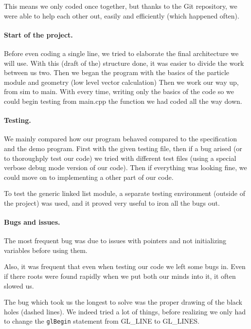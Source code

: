 \documentclass[a4paper]{article} %
\begin{document}
\begin{multicols*}{2}
This means we only coded once together, but thanks to the Git repository,
we were able to help each other out, easily and efficiently (which happened often).

\paragraph{Start of the project.} Before even coding a single line, we tried to elaborate the final
architecture we will use. With this (draft of the) structure done, it was easier
to divide the work between us two.
Then we began the program with the basics of the particle module and geometry (low level vector calculation)
Then we work our way up, from sim to main. With every time, writing only the basics of the code so we could begin testing from main.cpp
the function we had coded all the way down.

\paragraph{Testing.}
We mainly compared how our program behaved compared to the specification and the demo program.
First with the given testing file, then if a bug arised (or to thoroughply test our code)
we tried with different test files (using a special verbose debug mode version of our code).
Then if everything was looking fine, we could move on to implementing a other part of our code.

To test the generic linked list module, a separate testing environment (outside of the project)
was used, and it proved very useful to iron all the bugs out.

\paragraph{Bugs and issues.}
The most frequent bug was due to issues with pointers and not initializing variables before using them.

Also, it was frequent that even when testing our code we left some bugs in.
Even if there roots were found rapidly when we put both our minds into it, it often slowed us.

The bug which took us the longest to solve was the proper drawing of the black holes (dashed lines).
We indeed tried a lot of things, before realizing we only had to change the \texttt{glBegin} statement from GL\_LINE to GL\_LINES.



\end{multicols*}
\end{document}
